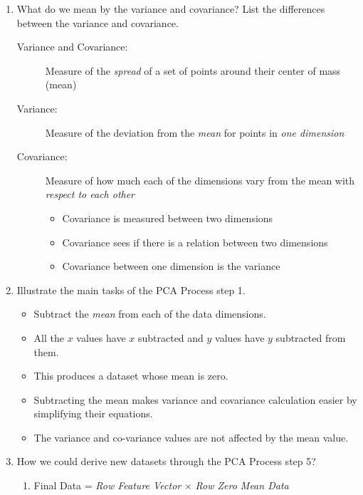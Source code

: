 \documentclass[12pt]{article}
\newenvironment{QandA}{\begin{enumerate}[label=\bfseries\arabic*.]\bfseries}
{\end{enumerate}}
\newenvironment{answered}{\par\normalfont\color{Sepia}}{}
\begin{document}
\begin{QandA}
    \item What do we mean by the variance and covariance? List the differences between the variance and covariance.
    \begin{answered}
        \begin{description}
            \item[Variance and Covariance:] Measure of the \textit{spread} of a set of points around their center of mass (mean)
            \item[Variance:] Measure of the deviation from the \textit{mean} for points in \textit{one dimension}
            \item[Covariance:] Measure of how much each of the dimensions vary from the mean with \textit{respect to each other}
            \begin{itemize}
                \item Covariance is measured between two dimensions
                \item Covariance sees if there is a relation between two dimensions
                \item Covariance between one dimension is the variance
            \end{itemize} 
        \end{description}
    \end{answered}

    \item Illustrate the main tasks of the PCA Process \textemdash{} step 1.
    \begin{answered}
        \begin{itemize}
            \item Subtract the \textit{mean} from each of the data dimensions.
            \item All the $x$ values have $x$ subtracted and $y$ values have $y$ subtracted from them.
            \item This produces a dataset whose mean is zero.
            \item Subtracting the mean makes variance and covariance calculation easier by simplifying their equations.
            \item The variance and co-variance values are not affected by the mean value.
        \end{itemize}
    \end{answered}

    \item How we could derive new datasets through the PCA Process \textemdash{} step 5?
    \begin{answered}
        \begin{enumerate}
            \item Final Data = \textit{Row Feature Vector} $\times$ \textit{Row Zero Mean Data}
            

\end{enumerate}
\end{answered}
\end{QandA}
\end{document}
